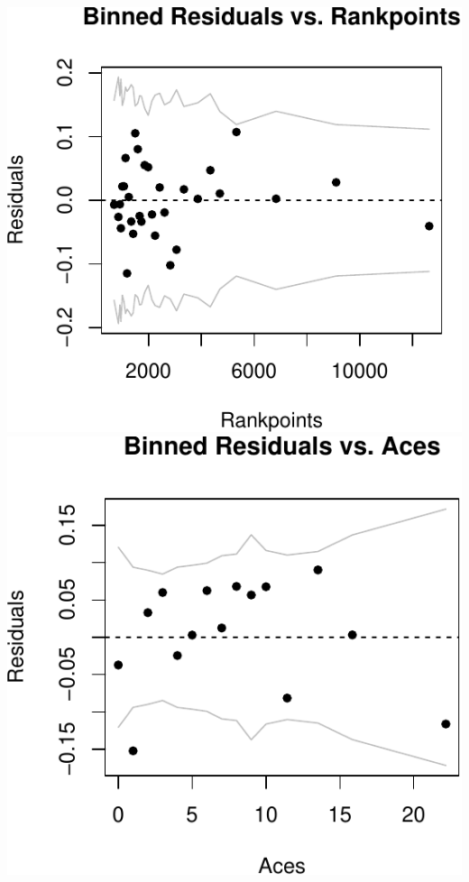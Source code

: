 \documentclass[]{article}
\begin{document}
\includegraphics{Project_files/figure-latex/unnamed-chunk-14-3.pdf}
\includegraphics{Project_files/figure-latex/unnamed-chunk-14-4.pdf}
\end{document}
